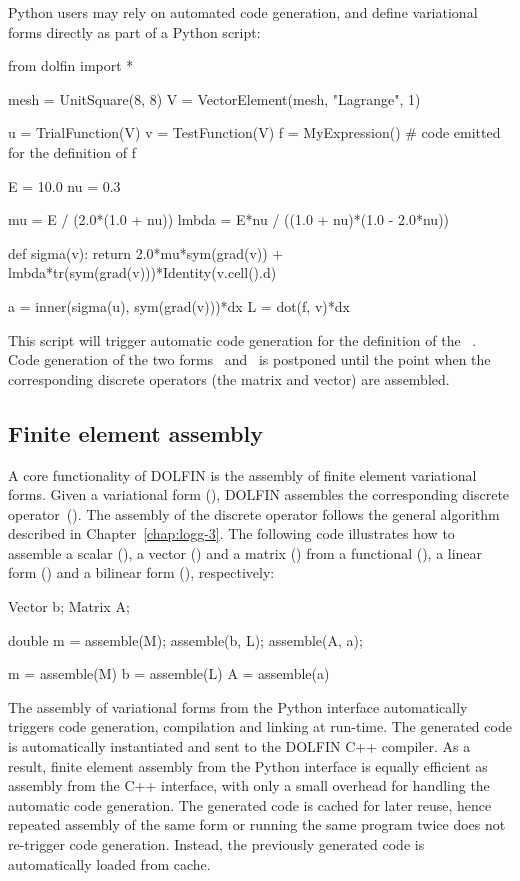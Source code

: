 Python users may rely on automated code generation, and define variational
forms directly as part of a Python script:
\begin{python}
from dolfin import *

mesh = UnitSquare(8, 8)
V = VectorElement(mesh, "Lagrange", 1)

u = TrialFunction(V)
v = TestFunction(V)
f = MyExpression() # code emitted for the definition of f

E  = 10.0
nu = 0.3

mu    = E / (2.0*(1.0 + nu))
lmbda = E*nu / ((1.0 + nu)*(1.0 - 2.0*nu))

def sigma(v):
    return 2.0*mu*sym(grad(v)) + lmbda*tr(sym(grad(v)))*Identity(v.cell().d)

a = inner(sigma(u), sym(grad(v)))*dx
L = dot(f, v)*dx
\end{python}
This script will trigger automatic code generation for the definition
of the ~. Code generation of the two
forms~ and~ is postponed until the point when the
corresponding discrete operators (the matrix and vector) are
assembled.

\subsection{Finite element assembly}

A core functionality of DOLFIN is the assembly of finite element
variational forms. Given a variational form (), DOLFIN assembles
the corresponding discrete operator~(). The assembly of the
discrete operator follows the general algorithm described in
Chapter~\ref{chap:logg-3}. The following code illustrates how to
assemble a scalar (), a vector () and a matrix ()
from a functional (), a linear form () and a bilinear
form (), respectively:
\begin{c++}
Vector b;
Matrix A;

double m = assemble(M);
assemble(b, L);
assemble(A, a);
\end{c++}
\begin{python}
m = assemble(M)
b = assemble(L)
A = assemble(a)
\end{python}
The assembly of variational forms from the Python interface
automatically triggers code generation, compilation and linking at
run-time. The generated code is automatically instantiated and sent to
the DOLFIN C++ compiler. As a result, finite element assembly from the
Python interface is equally efficient as assembly from the C++
interface, with only a small overhead for handling the automatic code
generation. The generated code is cached for later reuse, hence
repeated assembly of the same form or running the same program twice
does not re-trigger code generation. Instead, the previously generated
code is automatically loaded from cache.

